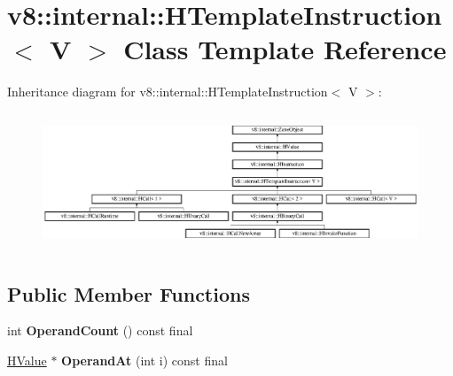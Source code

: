 \hypertarget{classv8_1_1internal_1_1_h_template_instruction}{}\section{v8\+:\+:internal\+:\+:H\+Template\+Instruction$<$ V $>$ Class Template Reference}
\label{classv8_1_1internal_1_1_h_template_instruction}
Inheritance diagram for v8\+:\+:internal\+:\+:H\+Template\+Instruction$<$ V $>$\+:\begin{figure}[H]
\begin{center}
\leavevmode
\includegraphics[height=4.117647cm]{classv8_1_1internal_1_1_h_template_instruction}
\end{center}
\end{figure}
\subsection*{Public Member Functions}
\begin{DoxyCompactItemize}
\item 
int {\bfseries Operand\+Count} () const  final\hypertarget{classv8_1_1internal_1_1_h_template_instruction_acea4f5a164b456aff1f9a38b804d543b}{}\label{classv8_1_1internal_1_1_h_template_instruction_acea4f5a164b456aff1f9a38b804d543b}

\item 
\hyperlink{classv8_1_1internal_1_1_h_value}{H\+Value} $\ast$ {\bfseries Operand\+At} (int i) const  final\hypertarget{classv8_1_1internal_1_1_h_template_instruction_af682ef587a1fe14a1cfadd8583bb9d8d}{}\label{classv8_1_1internal_1_1_h_template_instruction_af682ef587a1fe14a1cfadd8583bb9d8d}

\end{DoxyCompactItemize}
